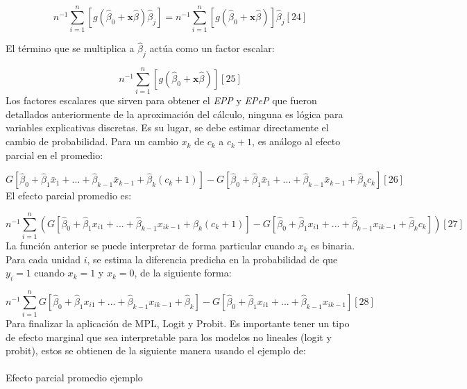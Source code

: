 \documentclass[
  letterpaper,
  DIV=11,
  numbers=noendperiod]{scrreprt}
\makeatletter
\let\oldparagraph\paragraph
\renewcommand{\paragraph}{
    \@ifstar
      \xxxParagraphStar
      \xxxParagraphNoStar
  }
\newcommand{\xxxParagraphStar}[1]{\oldparagraph*{#1}\mbox{}}
\newcommand{\xxxParagraphNoStar}[1]{\oldparagraph{#1}\mbox{}}
\newenvironment{Shaded}{\begin{snugshade}}{\end{snugshade}}
\newcommand{\CommentTok}[1]{\textcolor[rgb]{0.37,0.37,0.37}{#1}}
\newcommand{\DecValTok}[1]{\textcolor[rgb]{0.68,0.00,0.00}{#1}}
\newcommand{\FunctionTok}[1]{\textcolor[rgb]{0.28,0.35,0.67}{#1}}
\newcommand{\NormalTok}[1]{\textcolor[rgb]{0.00,0.23,0.31}{#1}}
\newcommand{\SpecialCharTok}[1]{\textcolor[rgb]{0.37,0.37,0.37}{#1}}
\makeatother
\begin{document}
\[n^{-1}\sum_{i=1}^n[g(\hat{\beta}_0+\mathbf{x}\hat{\beta})\hat{\beta}_j]=n^{-1}\sum_{i=1}^n[g(\hat{\beta}_0+\mathbf{x}\hat{\beta})]\hat{\beta}_j [24]\]

El término que se multiplica a \(\hat{\beta}_j\) actúa como un factor
escalar:

\[
n^{-1}\sum_{i=1}^n[g(\hat{\beta}_0+\mathbf{x}\hat{\beta})] [25]
\] Los factores escalares que sirven para obtener el \emph{EPP} y
\emph{EPeP} que fueron detallados anteriormente de la aproximación del
cálculo, ninguna es lógica para variables explicativas discretas. Es su
lugar, se debe estimar directamente el cambio de probabilidad. Para un
cambio \(x_k\) de \(c_k\) a \(c_k+1\), es análogo al efecto parcial en
el promedio:

\[G[\hat{\beta}_0+\hat{\beta}_1\bar{x}_1+...+\hat{\beta}_{k-1}\bar{x}_{k-1}+\hat{\beta}_k(c_k+1)]-G[\hat{\beta}_0+\hat{\beta}_1\bar{x}_1+...+\hat{\beta}_{k-1}\bar{x}_{k-1}+\hat{\beta}_kc_k] [26]\]
El efecto parcial promedio es:

\[n^{-1}\sum_{i=1}^n(G[\hat{\beta}_0+\hat{\beta}_1x_{i1}+...+\hat{\beta}_{k-1}x_{ik-1}+\hat{\beta}_k(c_k+1)]-G[\hat{\beta}_0+\hat{\beta}_1x_{i1}+...+\hat{\beta}_{k-1}x_{ik-1}+\hat{\beta}_kc_k])[27]\]
La función anterior se puede interpretar de forma particular cuando
\(x_k\) es binaria. Para cada unidad \(i\), se estima la diferencia
predicha en la probabilidad de que \(y_i=1\) cuando \(x_k=1\) y
\(x_k=0\), de la siguiente forma:

\[n^{-1}\sum _{i=1}^nG[\hat{\beta}_0+\hat{\beta}_1x_{i1}+...+\hat{\beta}_{k-1}x_{ik-1}+\hat{\beta}_k]-G[\hat{\beta}_0+\hat{\beta}_1x_{i1}+...+\hat{\beta}_{k-1}x_{ik-1}] [28]\]
Para finalizar la aplicación de MPL, Logit y Probit. Es importante tener
un tipo de efecto marginal que sea interpretable para los modelos no
lineales (logit y probit), estos se obtienen de la siguiente manera
usando el ejemplo de:

\paragraph{Efecto parcial promedio
ejemplo}\label{efecto-parcial-promedio-ejemplo}

\begin{Shaded}
\end{Shaded}
\end{document}

